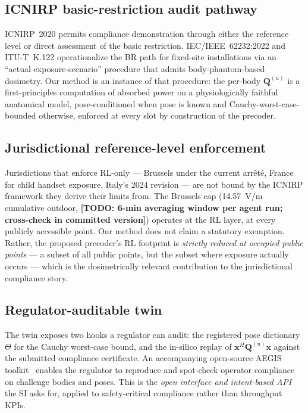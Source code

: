 \documentclass[journal,twocolumn,10pt]{IEEEtran}
\theoremstyle{definition}
\newcommand{\TODO}[1]{\textcolor{red!80!black}{\textbf{[TODO: #1]}}}
\newcommand{\xx}{\mathbf{x}}
\newcommand{\Q}{\mathbf{Q}}
\begin{document}
\subsection{ICNIRP basic-restriction audit pathway}

ICNIRP~2020 permits compliance demonstration through either the
reference level or direct assessment of the basic restriction.
IEC/IEEE~62232:2022 and ITU-T~K.122 operationalize the BR path
for fixed-site installations via an
``actual-exposure-scenario'' procedure that admits
body-phantom-based dosimetry. Our method is an instance of that
procedure: the per-body $\Q^{(u)}$ is a first-principles
computation of absorbed power on a physiologically faithful
anatomical model, pose-conditioned when pose is known and
Cauchy-worst-case-bounded otherwise, enforced at every slot by
construction of the precoder.

\subsection{Jurisdictional reference-level enforcement}

Jurisdictions that enforce RL-only --- Brussels under the current
arr\^et\'e, France for child handset exposure, Italy's 2024
revision --- are not bound by the ICNIRP framework they derive
their limits from. The Brussels cap (14.57~V/m cumulative
outdoor, \TODO{6-min averaging window per agent run; cross-check
in committed version}) operates at the RL layer, at every
publicly accessible point. Our method does not claim a statutory
exemption. Rather, the proposed precoder's RL footprint is
\emph{strictly reduced at occupied public points} --- a subset of
all public points, but the subset where exposure actually occurs
--- which is the dosimetrically relevant contribution to the
jurisdictional compliance story.

\subsection{Regulator-auditable twin}

The twin exposes two hooks a regulator can audit: the registered
pose dictionary $\Theta$ for the Cauchy worst-case bound, and
the in-silico replay of $\xx^H\Q^{(u)}\xx$ against the submitted
compliance certificate. An accompanying open-source AEGIS
toolkit~\cite{AEGIS} enables the regulator to reproduce and
spot-check operator compliance on challenge bodies and poses.
This is the \emph{open interface and intent-based API}
\cite{JSAC_CFP} the SI asks for, applied to
safety-critical compliance rather than throughput KPIs.
\end{document}

